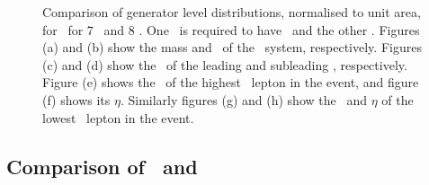 \begin{figure}
{    }
        \vspace{-2mm}
        \vspace{-2mm}
    \caption{\small Comparison of generator level distributions, normalised to
    unit area, for \ZZsllll\ for 7
    \tev\ and 8 \tev. One \Z\ is required to have \sstooosZ\ and the other
    \mZgtt. Figures (a)
    and (b) show the mass and \pt\ of the \ZZ\ system,
    respectively. Figures (c) and (d) show the \pt\ of the
    leading and subleading \Z, respectively. Figure (e) shows the \pt\ of the highest \pt\ lepton in the event, and figure (f) shows its
   $\eta$. Similarly figures (g) and (h) show the \pt\ and $\eta$ of the lowest
   \pt\ lepton in the event.}
    \label{fig:gen-comp-7-8-ZZs}
\end{figure}

\subsection{Comparison of \ggZZ\ and \qqZZ}


